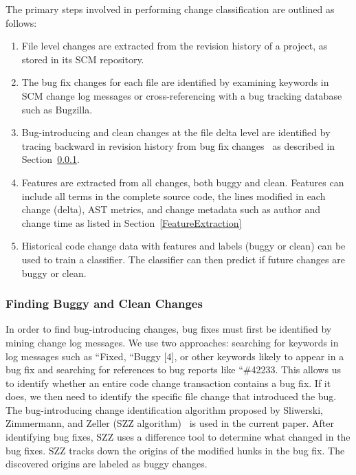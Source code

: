 \documentclass[10pt, conference, letterpaper, compsocconf]{IEEEtran}
\begin{document}
The primary steps involved in performing change classification 
are outlined as follows: 
\begin{enumerate}
\item File level changes are extracted from the revision history of a project,
as stored in its SCM repository. 
\item The bug fix changes for each file are identified by examining keywords
in SCM change log messages or cross-referencing with a bug tracking
database such as Bugzilla. 
\item Bug-introducing and clean changes at the file delta level are identified
by tracing backward in revision history from bug fix changes~\cite{Sliwerski2005} as described in Section~\ref{FindingBuggyCleanChanges}.
\item Features are extracted from all changes, both buggy and clean. Features
can include all terms in the complete source code, the lines modified
in each change (delta), AST metrics, and change
metadata such as author and change time as listed in Section~\ref{FeatureExtraction}
\item Historical code change data with features and labels (buggy or clean) can be used to train a classifier. The classifier can then
predict if future changes are buggy or clean.
\end{enumerate}

\subsubsection{Finding Buggy and Clean Changes}
\label{FindingBuggyCleanChanges} In order to find bug-introducing
changes, bug fixes must first be identified by mining change log messages.
We use two approaches: searching for keywords in log messages such
as ``Fixed\textquotedbl{}, ``Buggy\textquotedbl{} {[}4{]}, or other
keywords likely to appear in a bug fix and searching for references
to bug reports like ``\#42233\textquotedbl{}. This allows us to identify
whether an entire code change transaction contains a bug fix. If it
does, we then need to identify the specific file change that introduced
the bug. The bug-introducing change identification algorithm proposed
by Sliwerski, Zimmermann, and Zeller (SZZ algorithm)~\cite{Sliwerski2005}
is used in the current paper. After identifying bug fixes, SZZ uses
a difference tool to
determine what changed in the bug fixes. SZZ tracks down the origins of the modified hunks in the bug fix. The discovered origins are labeled as buggy changes.
\end{document}

